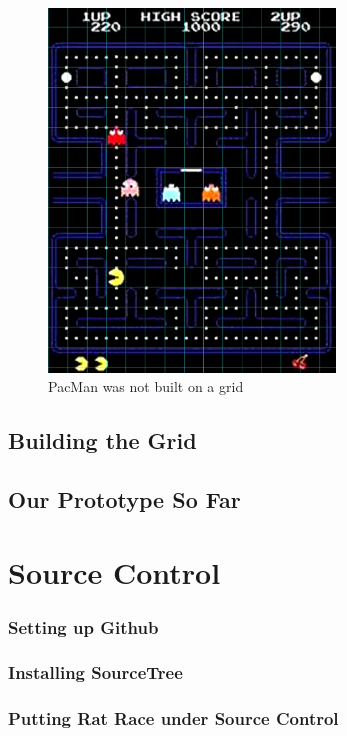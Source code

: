 \documentclass[12pt]{amsbook}
\theoremstyle{definition}
\theoremstyle{remark}
\numberwithin{figure}{chapter}
\numberwithin{table}{chapter}
\numberwithin{section}{chapter}
\numberwithin{equation}{section}
\begin{document}
\begin{figure}[h]
  \includegraphics[width=3in]{PacManGrid.png}
  \caption{PacMan was not built on a grid}
  \label{fig:pacmangrid}
\end{figure}

\section{Building the Grid}

\section{Our Prototype So Far}


\chapter{Source Control}

\subsection{Setting up Github}



\subsection{Installing SourceTree}


\subsection{Putting Rat Race under Source Control}
\end{document}
